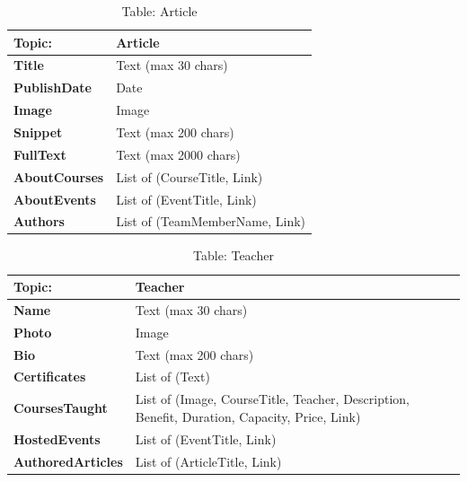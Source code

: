 \begin{table}[H]
\centering
\begin{tabularx}{\textwidth}{|>{\bfseries}l|X|}
\hline
Topic: & \textbf{Article} \\
\hline
Title & Text (max 30 chars) \\
\hline
PublishDate & Date \\
\hline
Image & Image \\
\hline
Snippet & Text (max 200 chars) \\
\hline
FullText & Text (max 2000 chars) \\
\hline
AboutCourses & List of (CourseTitle, Link) \\
\hline
AboutEvents & List of (EventTitle, Link) \\
\hline
Authors & List of (TeamMemberName, Link) \\
\hline
\end{tabularx}
\caption{Table: Article}
\end{table}

\begin{table}[H]
\centering
\begin{tabularx}{\textwidth}{|>{\bfseries}l|X|}
\hline
Topic: & \textbf{Teacher} \\
\hline
Name & Text (max 30 chars) \\
\hline
Photo & Image \\
\hline
Bio & Text (max 200 chars) \\
\hline
Certificates & List of (Text) \\
\hline
CoursesTaught & List of (Image, CourseTitle, Teacher, Description, Benefit, Duration, Capacity, Price, Link) \\
\hline
HostedEvents & List of (EventTitle, Link) \\
\hline
AuthoredArticles & List of (ArticleTitle, Link) \\
\hline
\end{tabularx}
\caption{Table: Teacher}
\end{table}


